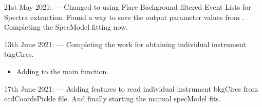 \documentclass[letterpaper,10pt,english]{sphinxmanual}
\begin{document}
\sphinxAtStartPar
21st May 2021:
—
Changed to using Flare Background filtered Event Lists for Spectra extraction.
Found a way to save the output parameter values from .
Completing the SpecModel fitting now.

\sphinxAtStartPar
13th June 2021:
—
Completing the work for obtaining individual instrument bkgCircs.
\begin{itemize}
\item {} 
\sphinxAtStartPar
Adding  to the main function.

\end{itemize}

\sphinxAtStartPar
17th June 2021:
—
Adding features to read individual instrument bkgCircs from ccdCoordsPickle file.
And finally starting the manual specModel fits.
\end{document}
